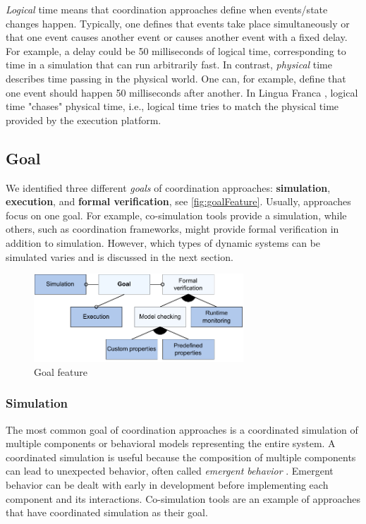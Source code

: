 \documentclass[runningheads]{llncs}
\begin{document}
\textit{Logical} time means that coordination approaches define when events/state changes happen.
Typically, one defines that events take place simultaneously or that one event causes another event or causes another event with a fixed delay.
For example, a delay could be 50 milliseconds of logical time, corresponding to time in a simulation that can run arbitrarily fast. 
In contrast, \textit{physical} time describes time passing in the physical world.
One can, for example, define that one event should happen 50 milliseconds after another.
In Lingua Franca \cite{lohstrohReactorsDeterministicModel2020}, logical time "chases" physical time, i.e., logical time tries to match the physical time provided by the execution platform.


\subsection{Goal} %
We identified three different \textit{goals} of coordination approaches: \textbf{simulation}, \textbf{execution}, and \textbf{formal verification}, see \autoref{fig:goalFeature}.
Usually, approaches focus on one goal.
For example, co-simulation tools provide a simulation, while others, such as coordination frameworks, might provide formal verification in addition to simulation.
However, which types of dynamic systems can be simulated varies and is discussed in the next section.

\begin{figure}[ht]
	\centering
	\includegraphics[width=0.7\textwidth]{images/goal_feature}
	\caption{Goal feature}
	\label{fig:goalFeature}
\end{figure}

\subsubsection{Simulation} The most common goal of coordination approaches is a coordinated simulation of multiple components or behavioral models representing the entire system.
A coordinated simulation is useful because the composition of multiple components can lead to unexpected behavior, often called \textit{emergent behavior} \cite{ekerTamingHeterogeneityPtolemy2003}.
Emergent behavior can be dealt with early in development before implementing each component and its interactions.
Co-simulation tools are an example of approaches that have coordinated simulation as their goal.
\end{document}
